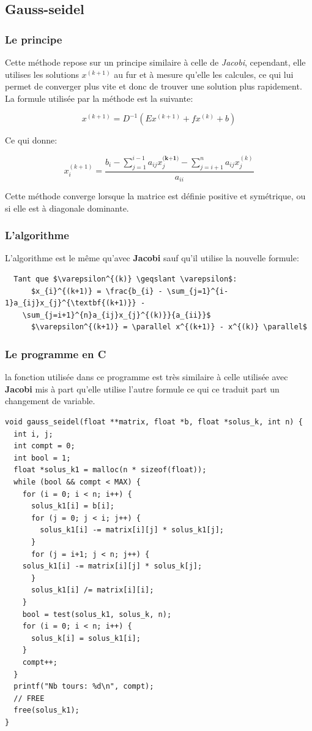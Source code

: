 \documentclass[a4paper]{article}
\begin{document}
\subsection{Gauss-seidel}

\subsubsection{Le principe}

Cette méthode repose sur un principe similaire à celle de \textit{Jacobi},
cependant, elle utilises les solutions $x^{(k+1)}$ au fur et à mesure qu'elle
les calcules, ce qui lui permet de converger plus vite et donc de trouver une
solution plus rapidement. La formule utilisée par la méthode est la suivante:

\[x^{(k+1)} = D^{-1}(Ex^{(k+1)} + fx^{(k)} + b)\]

Ce qui donne:

\[x_{i}^{(k+1)} = \frac{b_{i} - \sum_{j=1}^{i-1}a_{ij}x_{j}^{\textbf{(k+1)}} -
  \sum_{j=i+1}^{n}a_{ij}x_{j}^{(k)}}{a_{ii}}\]

Cette méthode converge lorsque la matrice est définie positive et symétrique, ou
si elle est à diagonale dominante.

\subsubsection{L'algorithme}

L'algorithme est le même qu'avec \textbf{Jacobi} sauf qu'il utilise la nouvelle formule:

\begin{lstlisting}
  Tant que $\varepsilon^{(k)} \geqslant \varepsilon$:
      $x_{i}^{(k+1)} = \frac{b_{i} - \sum_{j=1}^{i-1}a_{ij}x_{j}^{\textbf{(k+1)}} -
    \sum_{j=i+1}^{n}a_{ij}x_{j}^{(k)}}{a_{ii}}$
      $\varepsilon^{(k+1)} = \parallel x^{(k+1)} - x^{(k)} \parallel$
\end{lstlisting}

\subsubsection{Le programme en C}

la fonction utilisée dans ce programme est très similaire à celle utilisée avec
\textbf{Jacobi} mis à part qu'elle utilise l'autre formule ce qui ce traduit
part un changement de variable.

\begin{lstlisting}
void gauss_seidel(float **matrix, float *b, float *solus_k, int n) {
  int i, j;
  int compt = 0;
  int bool = 1;
  float *solus_k1 = malloc(n * sizeof(float));
  while (bool && compt < MAX) {
    for (i = 0; i < n; i++) {
      solus_k1[i] = b[i];
      for (j = 0; j < i; j++) {
        solus_k1[i] -= matrix[i][j] * solus_k1[j];
      }
      for (j = i+1; j < n; j++) {
	solus_k1[i] -= matrix[i][j] * solus_k[j];
      }
      solus_k1[i] /= matrix[i][i];
    }
    bool = test(solus_k1, solus_k, n);
    for (i = 0; i < n; i++) {
      solus_k[i] = solus_k1[i];
    }
    compt++;
  }
  printf("Nb tours: %d\n", compt);
  // FREE
  free(solus_k1);
}
\end{lstlisting}
\end{document}
